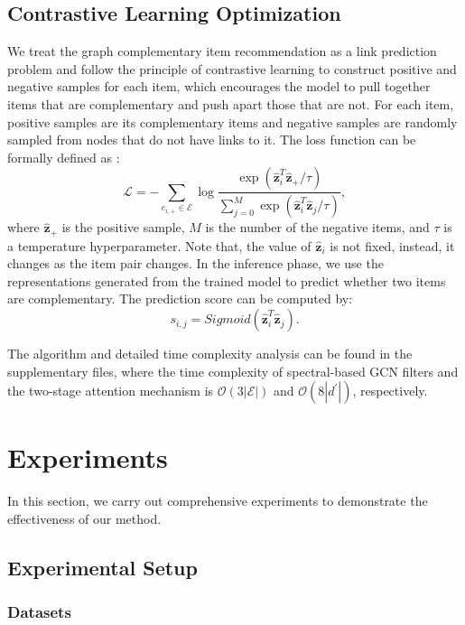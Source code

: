 \documentclass[letterpaper]{article} %
\begin{document}
 \subsection{Contrastive Learning Optimization} \label{sec:loss}
 We treat the graph complementary item recommendation as a link prediction problem and follow the principle of contrastive learning \cite{he2020momentum} to construct positive and negative samples for each item, which encourages the model to pull together items that are complementary and push apart those that are not. For each item, positive samples are its complementary items and negative samples are randomly sampled from nodes that do not have links to it. The loss function can be formally defined as :
 \begin{equation}
    \mathcal{L} = -\sum_{e_{i,+}\in\mathcal{E}}\log{\frac{\exp(\mathbf{\hat{z}}_i^T\mathbf{\hat{z}}_+/\tau)}{\sum_{j=0}^{M}\exp(\mathbf{\hat{z}}_i^T\mathbf{\hat{z}}_{j}/\tau)}},
    \label{eq:loss}
 \end{equation}
where $\mathbf{\hat{z}}_+$ is the positive sample, $M$ is the number of the negative items, and $\tau$ is a temperature hyperparameter. Note that, the value of $\mathbf{\hat{z}}_i$ is not fixed, instead, it changes as the item pair changes. In the inference phase, we use the representations generated from the trained model to predict whether two items are complementary. The prediction score can be computed by:
 \begin{equation}
     s_{i,j}=Sigmoid(\mathbf{\hat{z}}_i^T\mathbf{\hat{z}}_j).
     \label{eq:infer}
 \end{equation}

The algorithm and detailed time complexity analysis can be found in the supplementary files, where the time complexity of spectral-based GCN filters and the two-stage attention mechanism is $\mathcal{O}(3|\mathcal{E}|)$ and $\mathcal{O}(8|d^{\prime}|)$, respectively.

 \section{Experiments}

 In this section, we carry out comprehensive experiments to demonstrate the effectiveness of our method.
 \subsection{Experimental Setup}
 \subsubsection{Datasets}
\end{document}
